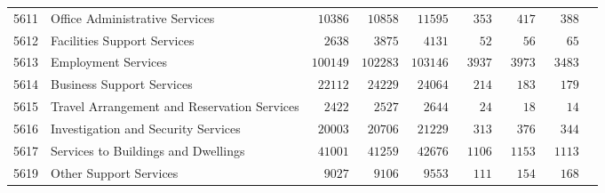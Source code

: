 \documentclass[9pt, oneside]{article}   	%
\begin{document}
\begin{longtable}{lp{3 in}ccccccc}
5611  & Office Administrative Services & $\phantom{0}10386$ & $\phantom{0}10858$ & $\phantom{0}11595$ & $\phantom{00}353$ & $\phantom{00}417$ & $\phantom{00}388$ \\
5612  & Facilities Support Services & $\phantom{00}2638$ & $\phantom{00}3875$ & $\phantom{00}4131$ & $\phantom{000}52$ & $\phantom{000}56$ & $\phantom{000}65$ \\
5613  & Employment Services & $100149$ & $102283$ & $103146$ & $\phantom{0}3937$ & $\phantom{0}3973$ & $\phantom{0}3483$ \\
5614  & Business Support Services & $\phantom{0}22112$ & $\phantom{0}24229$ & $\phantom{0}24064$ & $\phantom{00}214$ & $\phantom{00}183$ & $\phantom{00}179$ \\
5615  & Travel Arrangement and Reservation Services & $\phantom{00}2422$ & $\phantom{00}2527$ & $\phantom{00}2644$ & $\phantom{000}24$ & $\phantom{000}18$ & $\phantom{000}14$ \\
5616  & Investigation and Security Services & $\phantom{0}20003$ & $\phantom{0}20706$ & $\phantom{0}21229$ & $\phantom{00}313$ & $\phantom{00}376$ & $\phantom{00}344$ \\
5617  & Services to Buildings and Dwellings & $\phantom{0}41001$ & $\phantom{0}41259$ & $\phantom{0}42676$ & $\phantom{0}1106$ & $\phantom{0}1153$ & $\phantom{0}1113$ \\
5619  & Other Support Services & $\phantom{00}9027$ & $\phantom{00}9106$ & $\phantom{00}9553$ & $\phantom{00}111$ & $\phantom{00}154$ & $\phantom{00}168$ \\


\end{longtable}
\end{document}
